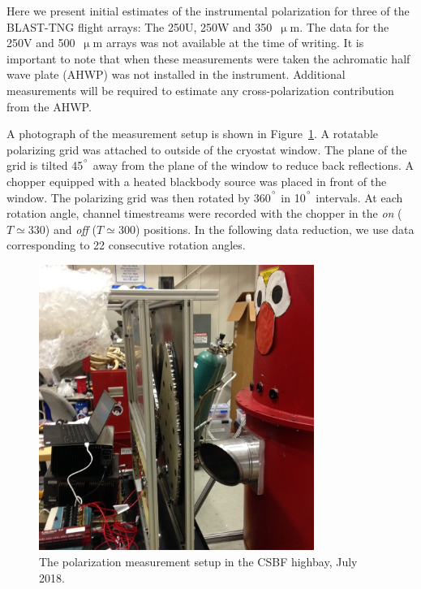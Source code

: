 Here we present initial estimates of the instrumental polarization for three of the BLAST-TNG flight arrays: The 250U, 250W and 350~$\upmu$m. The data for the 250V and 500~$\upmu$m arrays was not available at the time of writing. It is important to note that when these measurements were taken the achromatic half wave plate (AHWP) was not installed in the instrument. Additional measurements will be required to estimate any cross-polarization contribution from the AHWP.

A photograph of the measurement setup is shown in Figure~\ref{fig:pol setup}. A rotatable polarizing grid was attached to outside of the cryostat window. The plane of the grid is tilted 45$^{\degree}$ away from the plane of the window to reduce back reflections. A chopper equipped with a heated blackbody source was placed in front of the window. The polarizing grid was then rotated by 360$^{\degree}$ in 10$^{\degree}$ intervals. At each rotation angle, channel timestreams were recorded with the chopper in the \textit{on} ($T \simeq 330$) and \textit{off} ($T \simeq 300$) positions. In the following data reduction, we use data corresponding to 22 consecutive rotation angles.

\begin{figure}[!htbp]
\centering
\includegraphics[width=0.8\textwidth]{figures/blast_data/polarization/pol_meas_crop}
\caption[~The polarization measurement setup in the CSBF highbay, July 2018.]{The polarization measurement setup in the CSBF highbay, July 2018.}
\label{fig:pol setup}
\end{figure}

